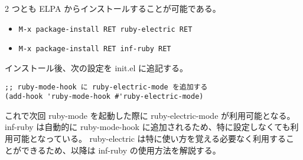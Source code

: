 2 つとも ELPA からインストールすることが可能である。
\begin{itemize}\setlength{\leftskip}{-1.00zw}%
\item[] \texttt{M-x package-install RET ruby-electric RET}
\item[] \texttt{M-x package-install RET inf-ruby RET}
\end{itemize}
インストール後、次の設定を init.el に追記する。
\begin{mdframed}[roundcorner=0.50zw,leftmargin=3.00zw,rightmargin=3.00zw,skipabove=0.40zw,skipbelow=0.40zw,innertopmargin=4.00pt,innerbottommargin=4.00pt,innerleftmargin=5.00pt,innerrightmargin=5.00pt,linecolor=gray!020,linewidth=0.50pt,backgroundcolor=gray!20]
\begin{verbatim}
;; ruby-mode-hook に ruby-electric-mode を追加する
(add-hook 'ruby-mode-hook #'ruby-electric-mode)
\end{verbatim}
\end{mdframed}
これで次回 ruby-mode を起動した際に ruby-electric-mode が利用可能となる。
inf-ruby は自動的に ruby-mode-hook に追加されるため、特に設定しなくても利用可能となっている。
ruby-electric は特に使い方を覚える必要なく利用することができるため、以降は inf-ruby の使用方法を解説する。
